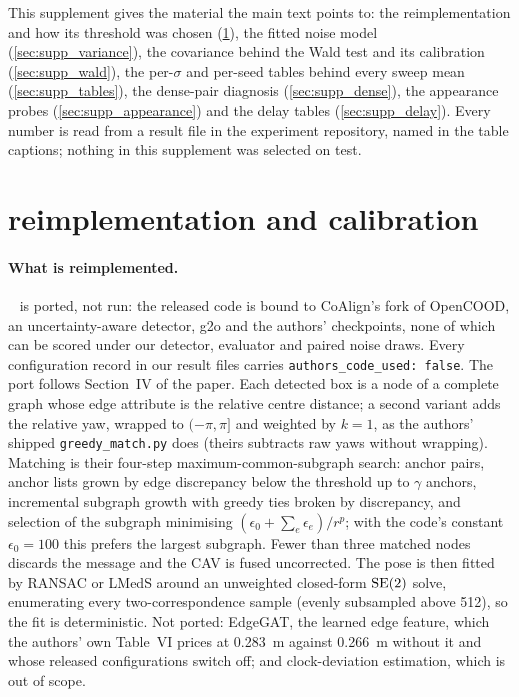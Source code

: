 \clearpage
\setcounter{page}{1}
\maketitlesupplementary
\appendix
\setcounter{table}{0}
\setcounter{figure}{0}

This supplement gives the material the main text points to: the \freealign reimplementation and how its threshold was chosen (\cref{sec:supp_freealign}), the fitted noise model (\cref{sec:supp_variance}), the covariance behind the Wald test and its calibration (\cref{sec:supp_wald}), the per-$\sigma$ and per-seed tables behind every sweep mean (\cref{sec:supp_tables}), the dense-pair diagnosis (\cref{sec:supp_dense}), the appearance probes (\cref{sec:supp_appearance}) and the delay tables (\cref{sec:supp_delay}). Every number is read from a result file in the experiment repository, named in the table captions; nothing in this supplement was selected on test.

\section{\freealign reimplementation and calibration}
\label{sec:supp_freealign}

\paragraph{What is reimplemented.}
\freealign~\cite{lei2024freealign} is ported, not run: the released code is bound to CoAlign's fork of OpenCOOD, an uncertainty-aware detector, g2o and the authors' checkpoints, none of which can be scored under our detector, evaluator and paired noise draws. Every configuration record in our result files carries \texttt{authors\_code\_used: false}. The port follows Section~IV of the paper. Each detected box is a node of a complete graph whose edge attribute is the relative centre distance; a second variant adds the relative yaw, wrapped to $(-\pi,\pi]$ and weighted by $k{=}1$, as the authors' shipped \texttt{greedy\_match.py} does (theirs subtracts raw yaws without wrapping). Matching is their four-step maximum-common-subgraph search: anchor pairs, anchor lists grown by edge discrepancy below the threshold up to $\gamma$ anchors, incremental subgraph growth with greedy ties broken by discrepancy, and selection of the subgraph minimising $(\epsilon_0+\sum_e\epsilon_e)/r^{p}$; with the code's constant $\epsilon_0{=}100$ this prefers the largest subgraph. Fewer than three matched nodes discards the message and the CAV is fused uncorrected. The pose is then fitted by RANSAC or LMedS around an unweighted closed-form $\mathrm{SE}(2)$ solve, enumerating every two-correspondence sample (evenly subsampled above 512), so the fit is deterministic. Not ported: EdgeGAT, the learned edge feature, which the authors' own Table~VI prices at \SI{0.283}{m} against \SI{0.266}{m} without it and whose released configurations switch off; and clock-deviation estimation, which is out of scope.

